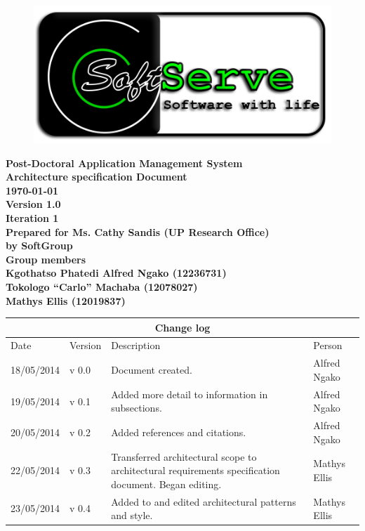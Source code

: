 \documentclass[12pt]{article}
\newcommand{\Title}{Architecture specification Document} %
\newcommand{\ssr}{Soft\color{green}{Serve }\color{black}}
\newcommand{\version}{1.0}
\newcommand{\iteration}{1}
\newcommand{\client}{Ms. Cathy Sandis (UP Research Office)}
\newcommand{\project}{Post-Doctoral Application Management System}
\begin{document}
\vspace{4em}

\begin{center}%

\begin{figure}[ht!]
\centering
\includegraphics{../Images_Docs/logo.png}
\end{figure}
\LARGE \bf \project \\[1em]
\LARGE \bf \Title \\[0.25em]
\large \bf \today\\
\bf Version \version\\
\bf Iteration \iteration\\[0.5em]
\Large \bf Prepared for \client\\
\Large \bf by
\Large {\bf \ssr Group }\\[0.5em]
\LARGE {\bf Group members}\\[0.25em]
\large
Kgothatso Phatedi Alfred Ngako (12236731) \\[0.5em]
Tokologo “Carlo” Machaba (12078027) \\[0.5em]
Mathys Ellis (12019837) \\[8em]

\end{center}%


\begin{center}
\begin{tabular}{|l|p{1.4cm}|p{8cm}|p{2.8cm}|}
\hline
\multicolumn{4}{|c|}{\bf Change log} \\
\hline
 Date & Version & Description &  Person \\
\hline
18/05/2014 & v 0.0 & Document created. & Alfred Ngako \\
\hline
19/05/2014 & v 0.1 & Added more detail to information in subsections. & Alfred Ngako \\
\hline
20/05/2014 & v 0.2 & Added references and citations. & Alfred Ngako \\
\hline
22/05/2014 & v 0.3 & Transferred architectural scope to architectural requirements specification document. Began editing. & Mathys Ellis \\
\hline
23/05/2014 & v 0.4 & Added to and edited architectural patterns and style. & Mathys Ellis \\
\hline
\end{tabular}
\end{center}
\newpage
\tableofcontents
\end{document}

